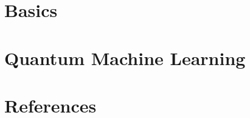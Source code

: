 \section[Basics]{Basics}

	

\section[QML]{Quantum Machine Learning}

	
	


\section[Refs]{References}
	

